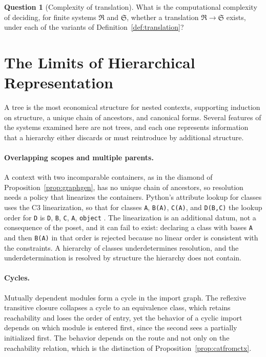 \documentclass[11pt]{article}
\theoremstyle{definition}
\newtheorem{question}[theorem]{Question}
\theoremstyle{remark}
\newcommand{\fR}{\mathfrak R}
\newcommand{\fS}{\mathfrak S}
\begin{document}
\begin{question}[Complexity of translation]\label{q:complexity}
What is the computational complexity of deciding, for finite systems $\fR$ and $\fS$, whether a translation $\fR\to\fS$ exists, under each of the variants of Definition~\ref{def:translation}?
\end{question}

\section{The Limits of Hierarchical Representation}

A tree is the most economical structure for nested contexts, supporting induction on structure, a unique chain of ancestors, and canonical forms. Several features of the systems examined here are not trees, and each one represents information that a hierarchy either discards or must reintroduce by additional structure.

\paragraph{Overlapping scopes and multiple parents.} A context with two incomparable containers, as in the diamond of Proposition~\ref{prop:graphgen}, has no unique chain of ancestors, so resolution needs a policy that linearizes the containers. Python's attribute lookup for classes uses the C3 linearization, so that for classes \texttt{A}, \texttt{B(A)}, \texttt{C(A)}, and \texttt{D(B,C)} the lookup order for \texttt{D} is \texttt{D}, \texttt{B}, \texttt{C}, \texttt{A}, \texttt{object} \cite{mro}. The linearization is an additional datum, not a consequence of the poset, and it can fail to exist: declaring a class with bases \texttt{A} and then \texttt{B(A)} in that order is rejected because no linear order is consistent with the constraints. A hierarchy of classes underdetermines resolution, and the underdetermination is resolved by structure the hierarchy does not contain.

\paragraph{Cycles.} Mutually dependent modules form a cycle in the import graph. The reflexive transitive closure collapses a cycle to an equivalence class, which retains reachability and loses the order of entry, yet the behavior of a cyclic import depends on which module is entered first, since the second sees a partially initialized first. The behavior depends on the route and not only on the reachability relation, which is the distinction of Proposition~\ref{prop:catfromctx}.
\end{document}
